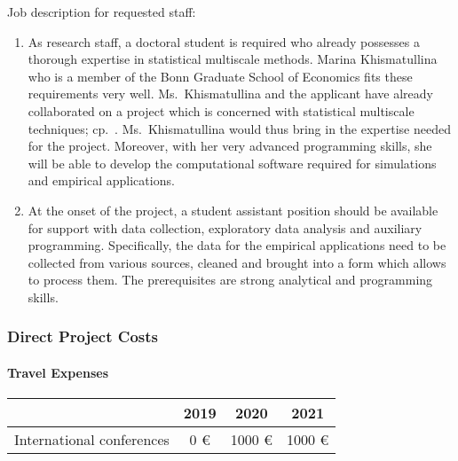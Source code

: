 \documentclass[a4paper,12pt]{article}
\begin{document}
\noindent Job description for requested staff: 
\begin{enumerate}[leftmargin=0.5cm]
\item As research staff, a doctoral student is required who already possesses a tho\-rough expertise in statistical multiscale methods. Marina Khismatullina who is a member of the Bonn Graduate School of Economics fits these requirements very well. Ms.\ Khismatullina and the applicant have already collaborated on a project which is concerned with statistical multiscale techniques; cp.\ \cite{KhismatullinaVogt2018}. Ms.\ Khismatullina would thus bring in the expertise needed for the project. Moreover, with her very advanced programming skills, she will be able to develop the computational software required for simulations and empirical applications. 
\item At the onset of the project, a student assistant position should be available for support with data collection, exploratory data analysis and auxiliary programming. Specifically, the data for the empirical applications need to be collected from various sources, cleaned and brought into a form which allows to process them. The prerequisites are strong analytical and programming skills.
\end{enumerate}

\subsubsection{Direct Project Costs} 


\paragraph{Travel Expenses}

\begin{center}

\begin{tabular}{l c c c}
 & 2019 & 2020 & 2021 \\
\hline 
International conferences & 0 \euro{} & 1000 \euro{} & 1000 \euro{} \\
\end{tabular}

\end{center}
\end{document}
